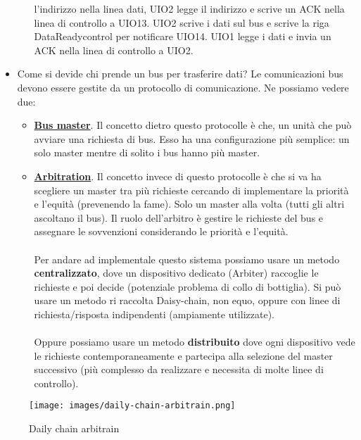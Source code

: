 \begin{itemize}
\begin{itemize}
        l'indirizzo nella linea dati, UIO2 legge il indirizzo e scrive un ACK nella linea di controllo a UIO13. UIO2 scrive i dati sul bus e scrive la riga DataReadycontrol per notificare UIO14. UIO1 legge i dati e invia un ACK nella linea di controllo a UIO2.
    \end{itemize}
    \item Come si devide chi prende un bus per trasferire dati? Le comunicazioni bus devono essere gestite da un protocollo di comunicazione. Ne possiamo vedere due:
    \begin{itemize}
        \item \underline{\textbf{Bus master}}. Il concetto dietro questo protocolle è che, un unità che può avviare una richiesta di bus. Esso ha una configurazione più semplice: un solo master mentre di solito i bus hanno più master.
        \item \underline{\textbf{Arbitration}}. Il concetto invece di questo protocolle è che si va ha scegliere un master tra più richieste cercando di implementare la priorità e l'equità (prevenendo la fame). Solo un master alla volta (tutti gli altri ascoltano il bus). Il ruolo dell'arbitro è gestire le richieste del bus e assegnare le sovvenzioni considerando le priorità e l'equità.\\\\
        Per andare ad implementale questo sistema possiamo usare un metodo \textbf{centralizzato}, dove un dispositivo dedicato (Arbiter) raccoglie le richieste e poi decide (potenziale problema di collo di bottiglia). Si può usare un metodo ri raccolta Daisy-chain, non equo, oppure con linee di richiesta/risposta indipendenti (ampiamente utilizzate).
        \\\\Oppure possiamo usare un metodo \textbf{distribuito} dove ogni dispositivo vede le richieste contemporaneamente e partecipa alla selezione del master successivo (più complesso da realizzare e necessita di molte linee di controllo).
    \end{itemize}
\end{itemize}

\begin{figure}[h!]
    \centering
    \texttt{[image: images/daily-chain-arbitrain.png]}
    \caption{Daily chain arbitrain}
\end{figure}

